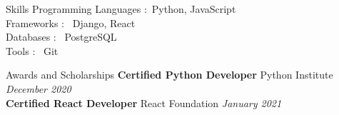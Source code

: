 \documentclass{resume} %
\begin{document}
\begin{rSection}{Skills}
{Programming Languages :}\
Python, JavaScript \\ 
{Frameworks : }\
Django, React \\ 
{Databases : }\
PostgreSQL \\ 
{Tools : }\
Git \\
\end{rSection}

\begin{rSection}{Awards and Scholarships}
{\bf Certified Python Developer} \hfill Python Institute \hfill {\em December 2020} \\ 
{\bf Certified React Developer} \hfill React Foundation \hfill {\em January 2021} \\ 

\end{rSection}
\end{document}
